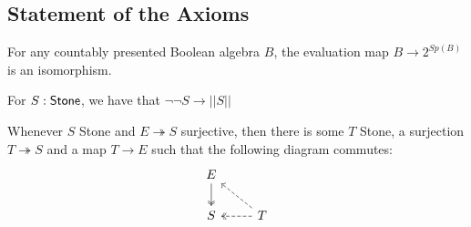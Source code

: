 
\subsection{Statement of the Axioms}
\begin{axiomNum}
  For any countably presented Boolean algebra $B$, the evaluation map $B\rightarrow  2^{Sp(B)}$ is an isomorphism.
\end{axiomNum} 

\begin{axiomNum}
  For $S:\mathsf{Stone}$, we have that $\neg \neg S \to || S ||$
\end{axiomNum}

%

\begin{axiomNum}
  Whenever $S$ Stone and $E\twoheadrightarrow S$ surjective, then there is some $T$ Stone,
    a surjection $T \twoheadrightarrow S$ and a map $T\to E$ 
    such that the following diagram commutes:
    \begin{equation}\begin{tikzcd}
      E \arrow[d,""',two heads]\\
      S & \arrow[l, "", two heads, dashed] T\arrow[lu, ""',dashed ]
    \end{tikzcd}\end{equation}  
\end{axiomNum} 


